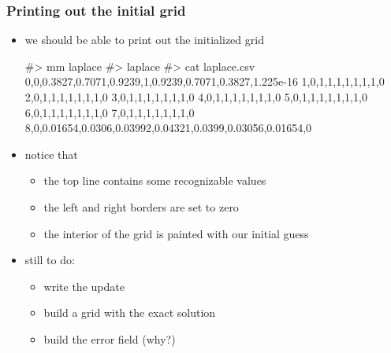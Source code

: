 %
%
%
%


\begin{frame}[fragile]
%
  \frametitle{Printing out the initial grid}
%
  \begin{itemize}
  \item we should be able to print out the initialized grid
%
  \begin{shell}{}
#> mm laplace
#> laplace
#> cat laplace.csv
0,0,0.3827,0.7071,0.9239,1,0.9239,0.7071,0.3827,1.225e-16
1,0,1,1,1,1,1,1,1,0
2,0,1,1,1,1,1,1,1,0
3,0,1,1,1,1,1,1,1,0
4,0,1,1,1,1,1,1,1,0
5,0,1,1,1,1,1,1,1,0
6,0,1,1,1,1,1,1,1,0
7,0,1,1,1,1,1,1,1,0
8,0,0.01654,0.0306,0.03992,0.04321,0.0399,0.03056,0.01654,0
  \end{shell}
%
  \item notice that
    \begin{itemize}
    \item the top line contains some recognizable values
    \item the left and right borders are set to zero
    \item the interior of the grid is painted with our initial guess
    \end{itemize}
%
  \item still to do:
    \begin{itemize}
    \item write the update
    \item build a grid with the exact solution 
    \item build the error field (why?)
    \end{itemize}
  \end{itemize}
%
\end{frame}

